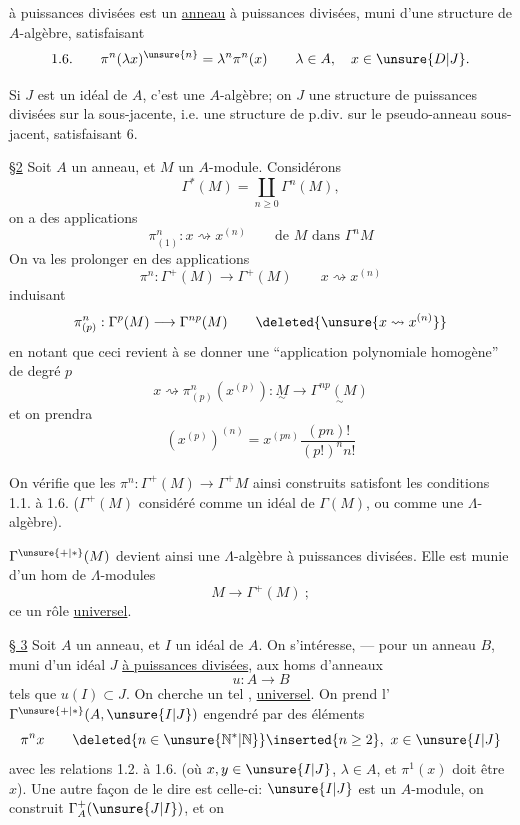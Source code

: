 à puissances divisées est un \uline{anneau} à puissances divisées, muni d'une structure de $A$-algèbre, satisfaisant
\[
1.6.\qquad\pi^n(\lambda x)^{\unsure{n}}=\lambda^n\pi^n(x)\qquad\lambda\in A,\quad x\in\unsure{D|J}.
\]

Si $J$ est un idéal de $A$, c'est une $A$-algèbre; on   $J$ une structure de puissances divisées sur la   sous-jacente, i.e. une structure de p.div. sur le pseudo-anneau sous-jacent, satisfaisant 6.

\uline{\S2} Soit $A$ un anneau, et $M$ un $A$-module. Considérons 
\[
\Gamma^*(M)=\coprod_{n\ge0}\Gamma^n(M),
\]
on a des applications
\[
\pi^n_{(1)}:x\rightsquigarrow x^{(n)}\qquad\text{de }M\text{ dans }\Gamma^nM
\]
On va les prolonger en des applications
\[
\pi^n:\Gamma^+(M)\longrightarrow\Gamma^+(M)\qquad x\rightsquigarrow x^{(n)}
\]
induisant
\[
\pi^n_{(p)}:\Gamma^p(M)\longrightarrow\Gamma^{np}(M)\qquad\deleted{\unsure{x\rightsquigarrow x^{(n)}}}
\]
en notant que ceci revient à se donner une ``application polynomiale homogène'' de degré $p$
\[
x\rightsquigarrow\pi^n_{(p)}(x^{(p)}):\underset{\sim}{M}\longrightarrow\underset{\sim}{\Gamma^{np}(M)}
\]
et on prendra
\[
(x^{(p)})^{(n)}=x^{(pn)}\frac{(pn)!}{(p!)^n n!}
\]


On vérifie que les $\pi^n:\Gamma^+(M)\longrightarrow\Gamma^+M$ ainsi construits satisfont les conditions 1.1. à 1.6. ($\Gamma^+(M)$ considéré comme un idéal de $\Gamma(M)$, ou comme une $\Lambda$-algèbre).

$\Gamma^{\unsure{+|*}}(M)$ devient ainsi une $\Lambda$-algèbre à puissances divisées. Elle est munie d'un hom de $\Lambda$-modules
\[
M\longrightarrow\Gamma^+(M)\ ;
\]
ce   un rôle \uline{universel}.

\uline{§ 3} Soit $A$ un anneau, et $I$ un idéal de $A$. On s'intéresse, --- pour un anneau $B$, muni d'un idéal $J$ \uline{à puissances divisées}, aux homs d'anneaux
\[
u:A\longrightarrow B
\]
tels que $u(I)\subset J$. On cherche un tel , \uline{universel}. On prend l'  $\Gamma^{\unsure{+|*}}(A,\unsure{I|J})$ engendré par des éléments
\[
\pi^n x\qquad \deleted{n\in\unsure{\mathbb N^{*}|\mathbb N}}\inserted{n\geq2},\ x\in\unsure{I|J}
\]
avec les relations 1.2. à 1.6. (où  $x,y\in\unsure{I|J}$, $\lambda\in A$, et $\pi^1(x)$ doit être $x$). Une autre façon de le dire est celle-ci: $\unsure{I|J}$ est un $A$-module, on construit $\Gamma_A^+(\unsure{J|I})$, et on


